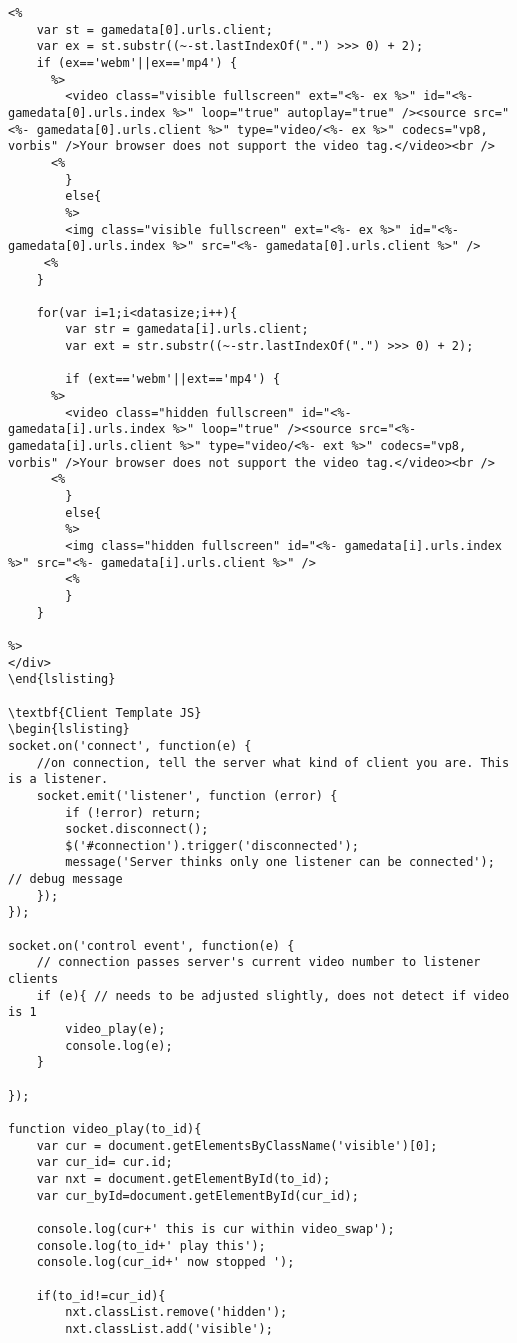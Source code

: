 \begin{lstlisting}
<% 
	var st = gamedata[0].urls.client;
	var ex = st.substr((~-st.lastIndexOf(".") >>> 0) + 2);
	if (ex=='webm'||ex=='mp4') {
      %>
        <video class="visible fullscreen" ext="<%- ex %>" id="<%- gamedata[0].urls.index %>" loop="true" autoplay="true" /><source src="<%- gamedata[0].urls.client %>" type="video/<%- ex %>" codecs="vp8, vorbis" />Your browser does not support the video tag.</video><br />
      <%
      	}
      	else{
      	%>
      	<img class="visible fullscreen" ext="<%- ex %>" id="<%- gamedata[0].urls.index %>" src="<%- gamedata[0].urls.client %>" />
     <%
 	}
	
	for(var i=1;i<datasize;i++){ 
		var str = gamedata[i].urls.client;
		var ext = str.substr((~-str.lastIndexOf(".") >>> 0) + 2);

		if (ext=='webm'||ext=='mp4') {
      %>
        <video class="hidden fullscreen" id="<%- gamedata[i].urls.index %>" loop="true" /><source src="<%- gamedata[i].urls.client %>" type="video/<%- ext %>" codecs="vp8, vorbis" />Your browser does not support the video tag.</video><br />
      <%
      	}
      	else{
      	%>
      	<img class="hidden fullscreen" id="<%- gamedata[i].urls.index %>" src="<%- gamedata[i].urls.client %>" />
      	<%
      	}     
	}

%>
</div>
\end{lslisting}

\textbf{Client Template JS}
\begin{lslisting}
socket.on('connect', function(e) {
	//on connection, tell the server what kind of client you are. This is a listener.
	socket.emit('listener', function (error) {
		if (!error) return;
		socket.disconnect();
		$('#connection').trigger('disconnected');
		message('Server thinks only one listener can be connected'); // debug message
	});
});

socket.on('control event', function(e) {
	// connection passes server's current video number to listener clients
	if (e){ // needs to be adjusted slightly, does not detect if video is 1
		video_play(e);
		console.log(e);
	}

});

function video_play(to_id){
	var cur = document.getElementsByClassName('visible')[0];
	var cur_id= cur.id;
	var nxt = document.getElementById(to_id);
	var cur_byId=document.getElementById(cur_id);
	
	console.log(cur+' this is cur within video_swap');
	console.log(to_id+' play this');
	console.log(cur_id+' now stopped ');

	if(to_id!=cur_id){
		nxt.classList.remove('hidden'); 
		nxt.classList.add('visible');


\end{lstlisting}
